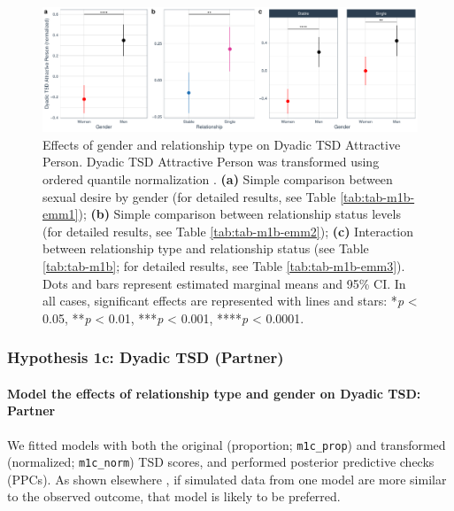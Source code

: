 \documentclass[
  bookmarksnumbered]{article}
\begin{document}
\begin{figure}
\centering
\includegraphics{Sexual_Desire_Arousal_anonymous_files/figure-latex/fig-h1b-1.pdf}
\caption{\label{fig:fig-h1b}Effects of gender and relationship type on Dyadic TSD Attractive Person. Dyadic TSD Attractive Person was transformed using ordered quantile normalization \autocite{petersonOrderedQuantileNormalization2020a}. \textbf{(a)} Simple comparison between sexual desire by gender (for detailed results, see Table \ref{tab:tab-m1b-emm1}); \textbf{(b)} Simple comparison between relationship status levels (for detailed results, see Table \ref{tab:tab-m1b-emm2}); \textbf{(c)} Interaction between relationship type and relationship status (see Table \ref{tab:tab-m1b}; for detailed results, see Table \ref{tab:tab-m1b-emm3}). Dots and bars represent estimated marginal means and 95\% CI. In all cases, significant effects are represented with lines and stars: *\emph{p} \textless{} 0.05, **\emph{p} \textless{} 0.01, ***\emph{p} \textless{} 0.001, ****\emph{p} \textless{} 0.0001.}
\end{figure}

\subsubsection{Hypothesis 1c: Dyadic TSD (Partner)}\label{hypothesis1c}

\paragraph{Model the effects of relationship type and gender on Dyadic TSD: Partner}\label{model-the-effects-of-relationship-type-and-gender-on-dyadic-tsd-partner}

We fitted models with both the original (proportion; \texttt{m1c\_prop}) and transformed (normalized; \texttt{m1c\_norm}) TSD scores, and performed posterior predictive checks (PPCs). As shown elsewhere \autocite[e.g.,][]{gabryVisualizationBayesianWorkflow2019}, if simulated data from one model are more similar to the observed outcome, that model is likely to be preferred.
\end{document}
